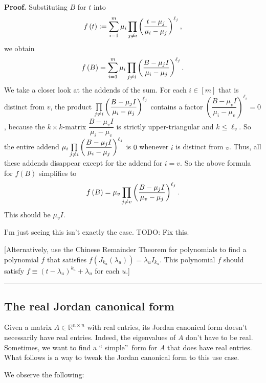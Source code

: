 \documentclass[numbers=enddot,12pt,final,onecolumn,notitlepage]{scrartcl}%
\numberwithin{exer}{subsection}
\theoremstyle{definition}
\newenvironment{proof}[1][Proof]{\noindent\textbf{#1.} }{\ \rule{0.5em}{0.5em}}
\let\sumnonlimits\sum
\let\prodnonlimits\prod
\renewcommand{\sum}{\sumnonlimits\limits}
\renewcommand{\prod}{\prodnonlimits\limits}
\begin{document}
\begin{proof}
Substituting $B$ for $t$ into%
\[
f\left(  t\right)  :=\sum_{i=1}^{m}\mu_{i}\prod\limits_{j\neq i}\left(
\dfrac{t-\mu_{j}}{\mu_{i}-\mu_{j}}\right)  ^{\ell_{j}},
\]
we obtain%
\[
f\left(  B\right)  =\sum_{i=1}^{m}\mu_{i}\prod\limits_{j\neq i}\left(
\dfrac{B-\mu_{j}I}{\mu_{i}-\mu_{j}}\right)  ^{\ell_{j}}.
\]
We take a closer look at the addends of the sum. For each $i\in\left[
m\right]  $ that is distinct from $v$, the product $\prod\limits_{j\neq
i}\left(  \dfrac{B-\mu_{j}I}{\mu_{i}-\mu_{j}}\right)  ^{\ell_{j}}$ contains a
factor $\left(  \dfrac{B-\mu_{v}I}{\mu_{i}-\mu_{v}}\right)  ^{\ell_{v}}=0$,
because the $k\times k$-matrix $\dfrac{B-\mu_{v}I}{\mu_{i}-\mu_{v}}$ is
strictly upper-triangular and $k\leq\ell_{v}$. So the entire addend $\mu
_{i}\prod\limits_{j\neq i}\left(  \dfrac{B-\mu_{j}I}{\mu_{i}-\mu_{j}}\right)
^{\ell_{j}}$ is $0$ whenever $i$ is distinct from $v$. Thus, all these addends
disappear except for the addend for $i=v$. So the above formula for $f\left(
B\right)  $ simplifies to%
\[
f\left(  B\right)  =\mu_{v}\prod\limits_{j\neq v}\left(  \dfrac{B-\mu_{j}%
I}{\mu_{v}-\mu_{j}}\right)  ^{\ell_{j}}.
\]
This should be $\mu_{v}I$.

I'm just seeing this isn't exactly the case. TODO: Fix this.

[Alternatively, use the Chinese Remainder Theorem for polynomials to find a
polynomial $f$ that satisfies $f\left(  J_{k_{u}}\left(  \lambda_{u}\right)
\right)  =\lambda_{u}I_{k_{u}}$. This polynomial $f$ should satisfy
$f\equiv\left(  t-\lambda_{u}\right)  ^{k_{u}}+\lambda_{u}$ for each $u$.]
\end{proof}

\subsection{The real Jordan canonical form}

Given a matrix $A\in\mathbb{R}^{n\times n}$ with real entries, its Jordan
canonical form doesn't necessarily have real entries. Indeed, the eigenvalues
of $A$ don't have to be real. Sometimes, we want to find a \textquotedblleft
simple\textquotedblright\ form for $A$ that does have real entries. What
follows is a way to tweak the Jordan canonical form to this use case.

We observe the following:
\end{document}
